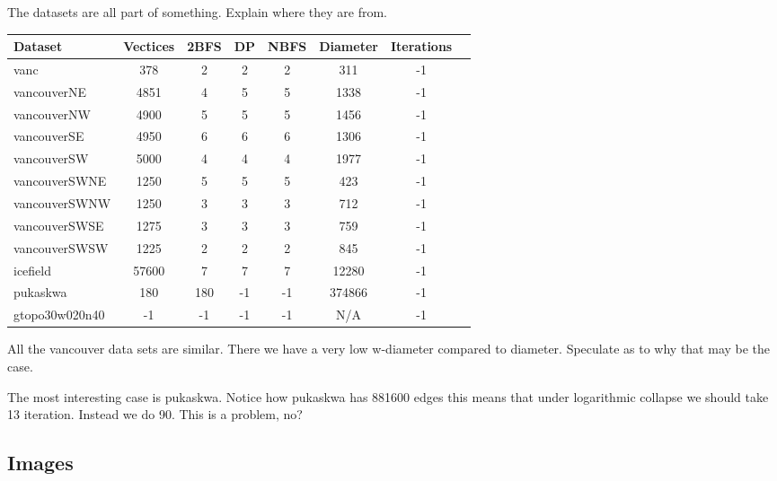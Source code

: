 The datasets are all part of something. Explain where they are from.


\begin{center}
\begin{tabular}{l*{6}{c}r}
Dataset             & Vectices  & 2BFS  & DP    & NBFS  & Diameter  & Iterations\\
\hline
vanc                & 378       & 2     & 2     & 2     & 311       & -1 \\
vancouverNE         & 4851      & 4     & 5     & 5     & 1338      & -1 \\
vancouverNW         & 4900      & 5     & 5     & 5     & 1456      & -1 \\
vancouverSE         & 4950      & 6     & 6     & 6     & 1306      & -1 \\
vancouverSW         & 5000      & 4     & 4     & 4     & 1977      & -1 \\
vancouverSWNE       & 1250      & 5     & 5     & 5     & 423       & -1 \\
vancouverSWNW       & 1250      & 3     & 3     & 3     & 712       & -1 \\
vancouverSWSE       & 1275      & 3     & 3     & 3     & 759       & -1 \\
vancouverSWSW       & 1225      & 2     & 2     & 2     & 845       & -1 \\
icefield            & 57600     & 7     & 7     & 7     & 12280     & -1 \\
pukaskwa            & 180       & 180   & -1    & -1    & 374866    & -1 \\
gtopo30w020n40      & -1        & -1    & -1    & -1    & N/A       & -1 \\

\end{tabular}
\end{center}

All the vancouver data sets are similar. There we have a very low w-diameter compared to diameter. Speculate as to why that may be the case.

The most interesting case is pukaskwa. Notice how pukaskwa has 881600 edges this means that under logarithmic collapse we should take 13 iteration. Instead we do 90. This is a problem, no?

\subsection{Images}

